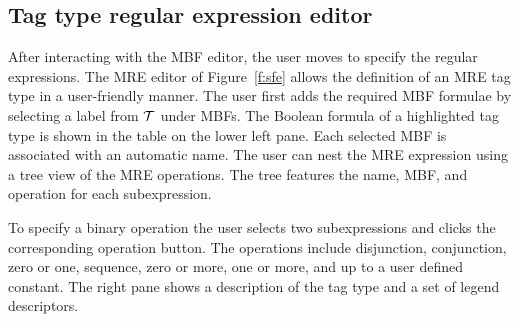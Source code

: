 \subsection{Tag type regular expression editor}

After interacting with the MBF editor, the user moves to 
specify the regular expressions. 
The MRE editor of Figure~\ref{f:sfe} allows the 
definition of an MRE tag type in a user-friendly manner. 
The user first adds the required MBF formulae 
by selecting a label from ${\cal T}$ under MBFs. 
The Boolean formula of a highlighted tag type is shown in the table on the lower left pane. 
Each selected MBF is associated with an automatic name. 
The user can nest the MRE expression using a tree view of the MRE operations. 
The tree features the name, MBF, and operation for each subexpression. 


To specify a binary operation the user selects two subexpressions and clicks the corresponding
operation button. 
The operations include disjunction, conjunction, zero or one, sequence, zero or more, 
one or more, and up to a user defined constant.
The right pane shows a description of the tag type and a set of legend 
descriptors. 

%

